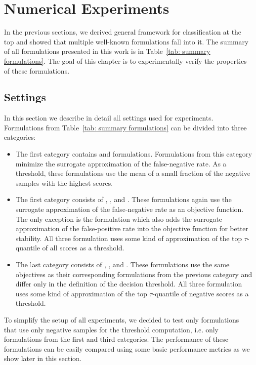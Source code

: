 \chapter{Numerical Experiments}\label{chap: experiments}

In the previous sections, we derived general framework for classification at the top and showed that multiple well-known formulations fall into it. The summary of all formulations presented in this work is in Table~\ref{tab: summary formulations}. The goal of this chapter is to experimentally verify the properties of these formulations. 

\section{Settings}

In this section we describe in detail all settings used for experiments. Formulations from Table~\ref{tab: summary formulations} can be divided into three categories:
\begin{itemize}
  \item The first category contains \TopPush and \TopPushK formulations. Formulations from this category minimize the surrogate approximation of the false-negative rate. As a threshold, these formulations use the mean of a small fraction of the negative samples with the highest scores.
  \item The first category consists of \Grill, \TopMeanK, and \PatMat. These formulations again use the surrogate approximation of the false-negative rate as an objective function. The only exception is the \Grill formulation which also adds the surrogate approximation of the false-positive rate into the objective function for better stability. All three formulation uses some kind of approximation of the top $\tau$-quantile of all scores as a threshold.
  \item The last category consists of \GrillNP, \tauFPL, and \PatMatNP. These formulations use the same objectives as their corresponding formulations from the previous category and differ only in the definition of the decision threshold. All three formulation uses some kind of approximation of the top $\tau$-quantile of negative scores as a threshold.
\end{itemize}
To simplify the setup of all experiments, we decided to test only formulations that use only negative samples for the threshold computation, i.e. only formulations from the first and third categories. The performance of these formulations can be easily compared using some basic performance metrics as we show later in this section.

